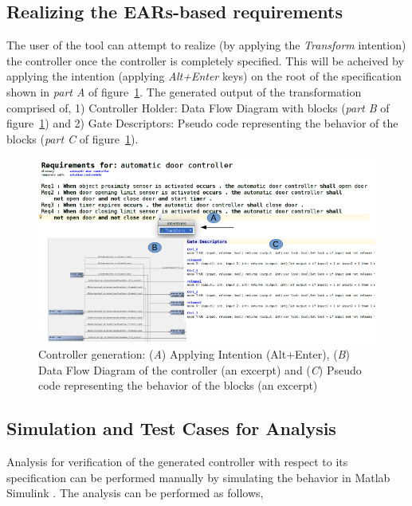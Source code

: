 \subsection{Realizing the EARs-based requirements}
\vspace{-.3cm}
The user of the tool can attempt to realize (by applying the \emph{Transform}
intention) the controller once the controller is completely specified. This will be acheived by applying the intention
(applying \emph{Alt+Enter} keys) on the root of the specification shown in
\emph{part A} of figure~\ref{fig:Spec_transform}. The generated output of the
transformation comprised of, 1) Controller Holder: Data Flow Diagram with blocks
(\emph{part B} of figure~\ref{fig:Spec_transform}) and 2) Gate Descriptors:
Pseudo code representing the behavior of the blocks (\emph{part C} of
figure~\ref{fig:Spec_transform}).
\vspace{-.7cm}
\begin{figure}[!h]
\centering
\includegraphics[width=1\textwidth]{./images/Spec_Transform.png}
\caption{Controller generation: (\emph{A}) Applying Intention (Alt+Enter),
(\emph{B}) Data Flow Diagram of the controller (an excerpt) and (\emph{C})
Pseudo code representing the behavior of the blocks (an excerpt)}
\label{fig:Spec_transform}
\end{figure}
\vspace{-1.2cm}
\subsection{Simulation and Test Cases for Analysis}
Analysis for verification of the generated controller with respect to its
specification can be performed manually by simulating the behavior in Matlab
Simulink \cite{MatlabSimulink}. The analysis can be performed as follows,
\vspace{-.5cm}
